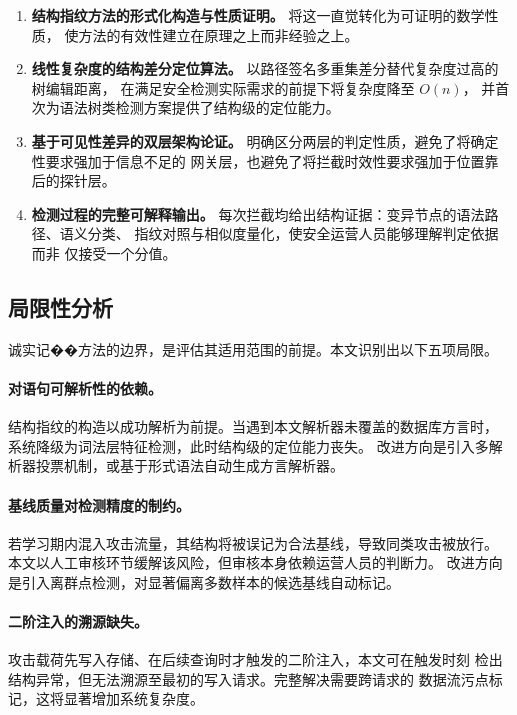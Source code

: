 \begin{enumerate}
  \item \textbf{结构指纹方法的形式化构造与性质证明。}
        将这一直觉转化为可证明的数学性质，
        使方法的有效性建立在原理之上而非经验之上。

  \item \textbf{线性复杂度的结构差分定位算法。}
        以路径签名多重集差分替代复杂度过高的树编辑距离，
        在满足安全检测实际需求的前提下将复杂度降至 $O(n)$，
        并首次为语法树类检测方案提供了结构级的定位能力。

  \item \textbf{基于可见性差异的双层架构论证。}
        明确区分两层的判定性质，避免了将确定性要求强加于信息不足的
        网关层，也避免了将拦截时效性要求强加于位置靠后的探针层。

  \item \textbf{检测过程的完整可解释输出。}
        每次拦截均给出结构证据：变异节点的语法路径、语义分类、
        指纹对照与相似度量化，使安全运营人员能够理解判定依据而非
        仅接受一个分值。
\end{enumerate}

\subsection{局限性分析}

诚实记��方法的边界，是评估其适用范围的前提。本文识别出以下五项局限。

\paragraph{对语句可解析性的依赖。}
结构指纹的构造以成功解析为前提。当遇到本文解析器未覆盖的数据库方言时，
系统降级为词法层特征检测，此时结构级的定位能力丧失。
改进方向是引入多解析器投票机制，或基于形式语法自动生成方言解析器。

\paragraph{基线质量对检测精度的制约。}
若学习期内混入攻击流量，其结构将被误记为合法基线，导致同类攻击被放行。
本文以人工审核环节缓解该风险，但审核本身依赖运营人员的判断力。
改进方向是引入离群点检测，对显著偏离多数样本的候选基线自动标记。

\paragraph{二阶注入的溯源缺失。}
攻击载荷先写入存储、在后续查询时才触发的二阶注入，本文可在触发时刻
检出结构异常，但无法溯源至最初的写入请求。完整解决需要跨请求的
数据流污点标记，这将显著增加系统复杂度。

